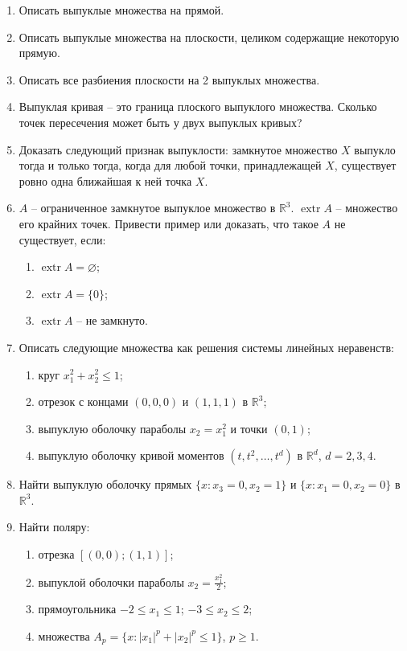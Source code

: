 	\begin{enumerate}
		\item Описать выпуклые множества на прямой.

		\item Описать выпуклые множества на плоскости, целиком содержащие некоторую прямую.

		\item Описать все разбиения плоскости на 2 выпуклых множества.

		\item Выпуклая кривая -- это граница плоского выпуклого множества. Сколько точек пересечения может быть у двух выпуклых кривых?

		\item Доказать следующий признак выпуклости: замкнутое множество $X$ выпукло тогда и только тогда, когда для любой точки, принадлежащей $X$, существует ровно одна ближайшая к ней точка $X$.

		\item $A$ -- ограниченное замкнутое выпуклое множество в $\mathbb{R}^3$. $\operatorname{extr} A$ -- множество его крайних точек. Привести пример или доказать, что такое $A$ не существует, если:
		  \begin{enumerate}
			  \item $\operatorname{extr} A = \varnothing$;
			  \item $\operatorname{extr} A = \{0\}$;
			  \item $\operatorname{extr} A$ -- не замкнуто.
		  \end{enumerate}

		\item Описать следующие множества как решения системы линейных неравенств:
		  \begin{enumerate}
			  \item круг $x_1^2 + x_2^2 \le 1$;
			  \item отрезок с концами $(0,0,0)$ и $(1,1,1)$ в $\mathbb{R}^3$;
			  \item выпуклую оболочку параболы $x_2 = x_1^2$ и точки $(0,1)$;
			  \item выпуклую оболочку кривой моментов $(t,t^2,\dots,t^d)$ в $\mathbb{R}^d$, $d=2,3,4$.
		  \end{enumerate}

		\item Найти выпуклую оболочку прямых $\{x: x_3=0, x_2=1\}$ и $\{x: x_1=0, x_2=0\}$ в $\mathbb{R}^3$.

		\item Найти поляру:
		\begin{enumerate}
			\item отрезка $\left[(0,0);(1,1)\right]$;
			\item выпуклой оболочки параболы $x_2 = \frac{x_1^2}{2}$;
			\item прямоугольника $-2 \le x_1 \le 1$; $-3 \le x_2 \le 2$;
			\item множества $A_p = \{x: |x_1|^p + |x_2|^p \le 1\}$, $p \ge 1$.
		\end{enumerate}


\end{enumerate}
